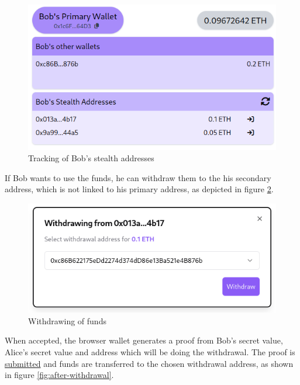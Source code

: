 \begin{figure}[h!]
    \centering
    \includegraphics[width=\textwidth]{assets/images/demo/stealth-address-tracking.png}
    \caption{Tracking of Bob's stealth addresses}
    \label{fig:stealth-address-tracking}
\end{figure}

If Bob wants to use the funds, he can withdraw them to the his secondary address,
which is not linked to his primary address, as depicted in figure \ref{fig:bob-withdraw}.

\begin{figure}[h!]
    \centering
    \includegraphics[width=\textwidth]{assets/images/demo/bob-withdraw.png}
    \caption{Withdrawing of funds}
    \label{fig:bob-withdraw}
\end{figure}

When accepted, the browser wallet generates a proof from Bob's secret value,
Alice's secret value and address which will be doing the withdrawal. The
proof is
\href{https://sepolia.etherscan.io/tx/0x78fabcfe3a78a7453cbe63c3f64340e80610fe6d5ceda8c250687facc52981a2}{submitted}
and funds are transferred to the chosen withdrawal address, as shown in figure \ref{fig:after-withdrawal}.

